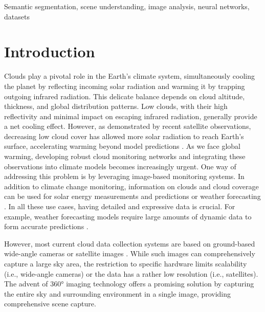 \documentclass[conference]{IEEEtran}
\begin{document}
\begin{IEEEkeywords}
Semantic segmentation, scene understanding, image analysis, neural networks, datasets
\end{IEEEkeywords}


\section{Introduction}
Clouds play a pivotal role in the Earth's climate system, simultaneously cooling the planet by reflecting incoming solar radiation and warming it by trapping outgoing infrared radiation. 
This delicate balance depends on cloud altitude, thickness, and global distribution patterns. 
Low clouds, with their high reflectivity and minimal impact on escaping infrared radiation, generally provide a net cooling effect. However, as demonstrated by recent satellite observations, decreasing low cloud cover has allowed more solar radiation to reach Earth's surface, accelerating warming beyond model predictions \cite{goessling2025recent}.
As we face global warming, developing robust cloud monitoring networks and integrating these observations into climate models becomes increasingly urgent.
One way of addressing this problem is by leveraging image-based monitoring systems.
In addition to climate change monitoring, information on clouds and cloud coverage can be used for solar energy measurements and predictions \cite{stephens2005} or weather forecasting \cite{Chu2018}. 
In all these use cases, having detailed and expressive data is crucial. 
For example, weather forecasting models require large amounts of dynamic data to form accurate predictions \cite{kunjumon2018, fathi2021}.

However, most current cloud data collection systems are based on ground-based wide-angle cameras \cite{swimseg, cloudsegnet} or satellite images \cite{morales2019end, mohajerani2019}. 
While such images can comprehensively capture a large sky area, the restriction to specific hardware limits scalability (i.e., wide-angle cameras) or the data has a rather low resolution (i.e., satellites). 
The advent of 360° imaging technology offers a promising solution by capturing the entire sky and surrounding environment in a single image, providing comprehensive scene capture.
\end{document}
